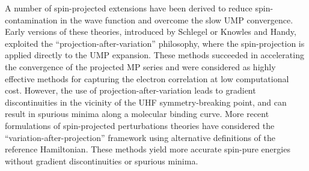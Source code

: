 \documentclass[aps,prb,reprint,noshowkeys,superscriptaddress]{revtex4-1}
\newcommand{\latin}[1]{#1}
\newcommand{\ie}{\latin{i.e.}}
\begin{document}
A number of spin-projected extensions have been derived to reduce spin-contamination in the wave function
and overcome the slow UMP convergence.
Early versions of these theories, introduced by Schlegel \cite{Schlegel_1986, Schlegel_1988} or 
Knowles and Handy,\cite{Knowles_1988a,Knowles_1988b} exploited the ``projection-after-variation'' philosophy,
where the spin-projection is applied directly to the UMP expansion.
These methods succeeded in accelerating the convergence of the projected MP series and were 
considered as highly effective methods for capturing the electron correlation at low computational cost.\cite{Knowles_1988b}
However, the use of projection-after-variation leads to gradient discontinuities in the vicinity of the UHF symmetry-breaking point,
and can result in spurious minima along a molecular binding curve.\cite{Schlegel_1986,Knowles_1988a}
More recent formulations of spin-projected perturbations theories have considered the  
``variation-after-projection'' framework using alternative definitions of the reference 
Hamiltonian.\cite{Tsuchimochi_2014,Tsuchimochi_2019}
These methods yield more accurate spin-pure energies without 
gradient discontinuities or spurious minima.

\end{document}
